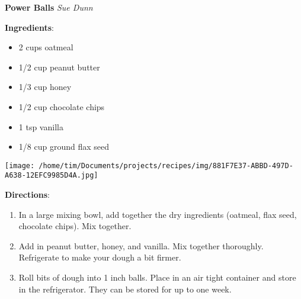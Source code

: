 \documentclass[11pt, twoside, openany]{book}
\begin{document}
\noindent\begin{minipage}[t]{\linewidth}%
{\Large\textbf{Power Balls}} \label{power-balls}\hfill\textit{Sue Dunn}\\
\noindent\begin{minipage}[t]{0.78\linewidth}%
\textbf{Ingredients}:\vspace{-3mm}
\begin{multicols}{2}
\begin{itemize}\setlength\itemsep{-1mm}
\item 2 cups oatmeal
\item 1/2 cup peanut butter
\item 1/3 cup honey
\item 1/2 cup chocolate chips
\item 1 tsp vanilla
\item 1/8 cup ground flax seed
\end{itemize}
\end{multicols}
\end{minipage}
\noindent\begin{minipage}[t]{0.18\linewidth}
\centering \strut\vspace*{-\baselineskip}\newline
\texttt{[image: /home/tim/Documents/projects/recipes/img/881F7E37-ABBD-497D-A638-12EFC9985D4A.jpg]}\\
\end{minipage}\vspace{3mm}
\textbf{Directions}:
\vspace{-3mm}\begin{enumerate}\setlength\itemsep{-1mm}
\item In a large mixing bowl, add together the dry ingredients (oatmeal, flax seed, chocolate chips). Mix together.
\item Add in peanut butter, honey, and vanilla. Mix together thoroughly. Refrigerate to make your dough a bit firmer.
\item Roll bits of dough into 1 inch balls. Place in an air tight container and store in the refrigerator. They can be stored for up to one week.
\end{enumerate}
\end{minipage}\vspace{8mm}
\end{document}
